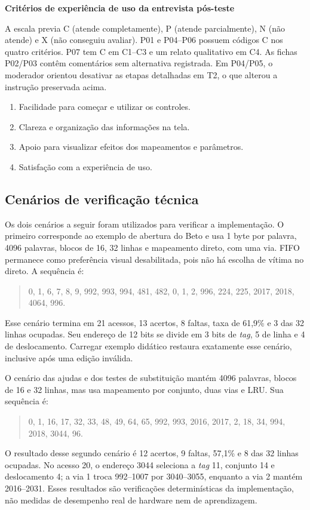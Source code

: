 \textbf{Critérios de experiência de uso da entrevista pós-teste}

A escala previa C (atende completamente), P (atende parcialmente), N (não atende) e X (não conseguiu avaliar). P01 e P04--P06 possuem códigos C nos quatro critérios. P07 tem C em C1--C3 e um relato qualitativo em C4. As fichas P02/P03 contêm comentários sem alternativa registrada. Em P04/P05, o moderador orientou desativar as etapas detalhadas em T2, o que alterou a instrução preservada acima.

\begin{enumerate}
\item[\textbf{C1.}] Facilidade para começar e utilizar os controles.
\item[\textbf{C2.}] Clareza e organização das informações na tela.
\item[\textbf{C3.}] Apoio para visualizar efeitos dos mapeamentos e parâmetros.
\item[\textbf{C4.}] Satisfação com a experiência de uso.
\end{enumerate}




\subsection*{Cenários de verificação técnica}
Os dois cenários a seguir foram utilizados para verificar a implementação. O primeiro corresponde ao exemplo de abertura do Beto e usa 1 byte por palavra, 4096 palavras, blocos de 16, 32 linhas e mapeamento direto, com uma via. FIFO permanece como preferência visual desabilitada, pois não há escolha de vítima no direto. A sequência é:

\begin{quote}\small
0, 1, 6, 7, 8, 9, 992, 993, 994, 481, 482, 0, 1, 2, 996, 224, 225, 2017, 2018, 4064, 996.
\end{quote}

Esse cenário termina em 21 acessos, 13 acertos, 8 faltas, taxa de 61,9\% e 3 das 32 linhas ocupadas. Seu endereço de 12 bits se divide em 3 bits de \textit{tag}, 5 de linha e 4 de deslocamento. Carregar exemplo didático restaura exatamente esse cenário, inclusive após uma edição inválida.

O cenário das ajudas e dos testes de substituição mantém 4096 palavras, blocos de 16 e 32 linhas, mas usa mapeamento por conjunto, duas vias e LRU. Sua sequência é:

\begin{quote}\small
0, 1, 16, 17, 32, 33, 48, 49, 64, 65, 992, 993, 2016, 2017, 2, 18, 34, 994, 2018, 3044, 96.
\end{quote}

O resultado desse segundo cenário é 12 acertos, 9 faltas, 57,1\% e 8 das 32 linhas ocupadas. No acesso 20, o endereço 3044 seleciona a \textit{tag} 11, conjunto 14 e deslocamento 4; a via 1 troca 992--1007 por 3040--3055, enquanto a via 2 mantém 2016--2031. Esses resultados são verificações determinísticas da implementação, não medidas de desempenho real de hardware nem de aprendizagem.

